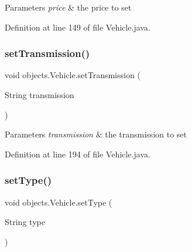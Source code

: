 \begin{DoxyParams}{Parameters}
{\em price} & the price to set \\
\hline
\end{DoxyParams}


Definition at line 149 of file Vehicle.\+java.


\begin{DoxyCode}{0}

\end{DoxyCode}
\mbox{\label{classobjects_1_1_vehicle_a46df4157f61a01a7f10f5e63379ec9ab}} 
\subsubsection{\texorpdfstring{setTransmission()}{setTransmission()}}
{\footnotesize\ttfamily void objects.\+Vehicle.\+set\+Transmission (\begin{DoxyParamCaption}\item[{String}]{transmission }\end{DoxyParamCaption})}


\begin{DoxyParams}{Parameters}
{\em transmission} & the transmission to set \\
\hline
\end{DoxyParams}


Definition at line 194 of file Vehicle.\+java.


\begin{DoxyCode}{0}

\end{DoxyCode}
\mbox{\label{classobjects_1_1_vehicle_a8e58c1d0bc06335155fbe8d725772967}} 
\subsubsection{\texorpdfstring{setType()}{setType()}}
{\footnotesize\ttfamily void objects.\+Vehicle.\+set\+Type (\begin{DoxyParamCaption}\item[{String}]{type }\end{DoxyParamCaption})}


